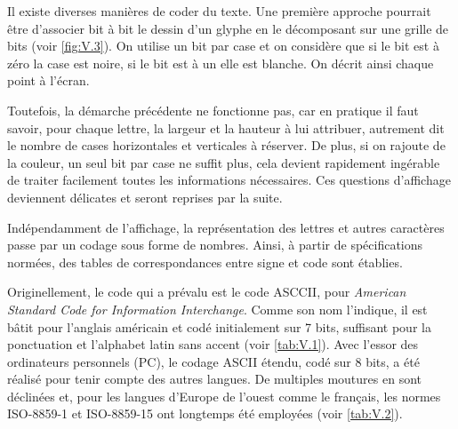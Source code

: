 Il existe diverses manières de coder du texte. Une première approche pourrait être d'associer bit à bit le dessin d'un glyphe en le décomposant sur une grille de bits (voir \cref{fig:V.3}). On utilise un bit par case et on considère que si le bit est à zéro la case est noire, si le bit est à un elle est blanche. On décrit ainsi chaque point à l'écran.

Toutefois, la démarche précédente ne fonctionne pas, car en pratique il faut savoir, pour chaque lettre, la largeur et la hauteur à lui attribuer, autrement dit le nombre de cases horizontales et verticales à réserver. De plus, si on rajoute de la couleur, un seul bit par case ne suffit plus, cela devient rapidement ingérable de traiter facilement toutes les informations nécessaires. Ces questions d'affichage deviennent délicates et seront reprises par la suite.

Indépendamment de l'affichage, la représentation des lettres et au\-tres caractères passe par un codage sous forme de nombres. Ainsi, à partir de spécifications normées, des tables de correspondances entre signe et code sont établies.

Originellement, le code qui a prévalu est le code ASCCII, pour \textit{American Standard Code for Information Interchange}. Comme son nom l'indique, il est bâtit pour l'anglais américain et codé initialement sur 7 bits, suffisant pour la ponctuation et l'alphabet latin sans accent (voir \cref{tab:V.1}). Avec l'essor des ordinateurs personnels (PC), le codage ASCII étendu, codé sur 8 bits, a été réalisé pour tenir compte des autres langues. De multiples moutures en sont déclinées et, pour les langues d'Europe de l'ouest comme le français, les normes ISO-8859-1 et ISO-8859-15 ont longtemps été employées (voir \cref{tab:V.2}).


\vfill\newpage

